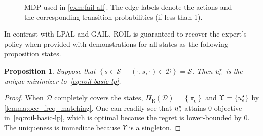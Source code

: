 \documentclass[10pt]{article}
\theoremstyle{plain}
\newtheorem{proposition}{Proposition}
\theoremstyle{remark}
\begin{document}
\begin{figure}
\centering
{}
\caption{MDP used in \cref{exm:fail-all}. The edge labels denote the actions and the corresponding transition probabilities (if less than 1).}
\label{fig:example-fail-one}
\end{figure}

In contrast with LPAL and GAIL, ROIL is guaranteed to recover the expert's policy when provided with demonstrations for all states as the following proposition states.  
\begin{proposition} \label{expert_recovery}
Suppose that $\left\{ s\in \mathcal{S} \; \mid \; (\cdot,s,\cdot) \in \mathcal{D} \right\} = \mathcal{S}$. Then $u_{\mathrm{e}}^{\mathnormal{\star}} $ is the unique minimizer to~\eqref{eq:roil-basic-lp}. %
\end{proposition}   
\begin{proof}
When $\mathcal{D}$ completely covers the states, $\Pi_{\mathrm{R}}(\mathcal{D}) = \left\{ \pi_{\mathrm{e}} \right\}$ and $\Upsilon = \left\{ u_{\mathrm{e}}^{\mathnormal{\star}} \right\}$ by \cref{lemma:occ_freq_matching}. One can readily see that $u_{\mathrm{e}}^{\mathnormal{\star}}$ attains $0$ objective in~\eqref{eq:roil-basic-lp}, which is optimal because the regret is lower-bounded by $0$. The uniqueness is immediate because $\Upsilon$ is a singleton.
\end{proof}
\end{document}
